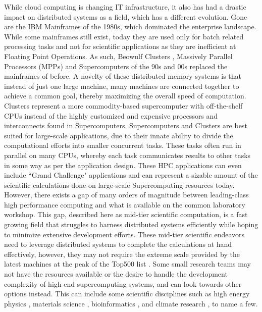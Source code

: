 While cloud computing is changing IT infrastructure, it also has had a drastic impact on distributed systems as a field,  which has a different evolution. Gone are the IBM Mainframes of the 1980s, which dominated the enterprise landscape.  While some mainframes still exist, today they are used only for batch related processing tasks and not for scientific applications as they are inefficient at Floating Point Operations.  As such, Beowulf Clusters \cite{sterling2001beowulf}, Massively Parallel Processors (MPPs) and Supercomputers of the 90s and 00s replaced the mainframes of before. A novelty of these distributed memory systems is that instead of just one large machine, many machines are connected together to achieve a common goal, thereby maximizing the overall speed of computation.  Clusters represent a more commodity-based supercomputer with off-the-shelf CPUs instead of the highly customized and expensive processors and interconnects found in Supercomputers.  
Supercomputers and Clusters are best suited for large-scale applications, due to their innate ability to divide the computational efforts into smaller concurrent tasks. These tasks often run in parallel on many CPUs, whereby each task communicates results to other tasks in some way as per the application design. These HPC applications can even include ``Grand Challenge" applications \cite{hoare2005grand} and can represent a sizable amount of the scientific calculations done on large-scale Supercomputing resources today. However, there exists a gap of many orders of magnitude  between leading-class high performance computing and what is available on the common laboratory workshop. This gap, described here as mid-tier scientific computation, is a fast growing field that struggles to harness distributed systems efficiently while hoping to minimize extensive development efforts. These mid-tier scientific endeavors need to leverage distributed systems to complete the calculations at hand effectively, however, they may not require the extreme scale provided by the latest machines at the peak of the Top500 list \cite{www-top500}.  Some small research teams may not have the resources available or the desire to handle the development complexity of high end supercomputing systems, and can look towards other options instead.  This can include some scientific disciplines such as high energy physics \cite{buncic2010cernvm}, materials science \cite{wang2006survey}, bioinformatics \cite{menon2012cloud}, and climate research \cite{He2010nasa}, to name a few.  


